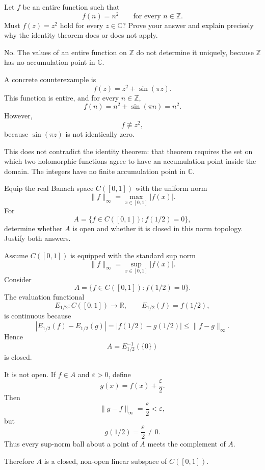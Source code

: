 \begin{problem}[CP-IV-0038]
\label{prob:cp-iv-0038}
Let $f$ be an entire function such that
\[
 f(n)=n^2\qquad\text{for every }n\in\mathbb Z.
\]
Must $f(z)=z^2$ hold for every $z\in\mathbb C$?
Prove your answer and explain precisely why the identity theorem does or does not apply.
\end{problem}

\begin{solution}
No. The values of an entire function on \(\mathbb Z\) do not determine it uniquely, because \(\mathbb Z\) has no accumulation point in \(\mathbb C\).

A concrete counterexample is
\[
f(z)=z^2+\sin(\pi z).
\]
This function is entire, and for every \(n\in\mathbb Z\),
\[
f(n)=n^2+\sin(\pi n)=n^2.
\]
However,
\[
f\not\equiv z^2,
\]
because \(\sin(\pi z)\) is not identically zero.

This does not contradict the identity theorem: that theorem requires the set on which two holomorphic functions agree to have an accumulation point inside the domain. The integers have no finite accumulation point in \(\mathbb C\).
\end{solution}


\begin{problem}[CP-IV-0040]
\label{prob:cp-iv-0040}
Equip the real Banach space $C([0,1])$ with the uniform norm
\[
 \|f\|_\infty=\max_{x\in[0,1]}|f(x)|.
\]
For
\[
 A=\{f\in C([0,1]):f(1/2)=0\},
\]
determine whether $A$ is open and whether it is closed in this norm topology.
Justify both answers.
\end{problem}

\begin{solution}
Assume \(C([0,1])\) is equipped with the standard sup norm
\[
\|f\|_\infty=\sup_{x\in[0,1]}|f(x)|.
\]
Consider
\[
A=\{f\in C([0,1]):f(1/2)=0\}.
\]
The evaluation functional
\[
E_{1/2}:C([0,1])\to\mathbb R,
\qquad
E_{1/2}(f)=f(1/2),
\]
is continuous because
\[
|E_{1/2}(f)-E_{1/2}(g)|
=
|f(1/2)-g(1/2)|
\le
\|f-g\|_\infty.
\]
Hence
\[
A=E_{1/2}^{-1}(\{0\})
\]
is closed.

It is not open. If \(f\in A\) and \(\varepsilon>0\), define
\[
g(x)=f(x)+\frac{\varepsilon}{2}.
\]
Then
\[
\|g-f\|_\infty=\frac{\varepsilon}{2}<\varepsilon,
\]
but
\[
g(1/2)=\frac{\varepsilon}{2}\neq0.
\]
Thus every sup-norm ball about a point of \(A\) meets the complement of \(A\).

Therefore \(A\) is a closed, non-open linear subspace of \(C([0,1])\).
\end{solution}


